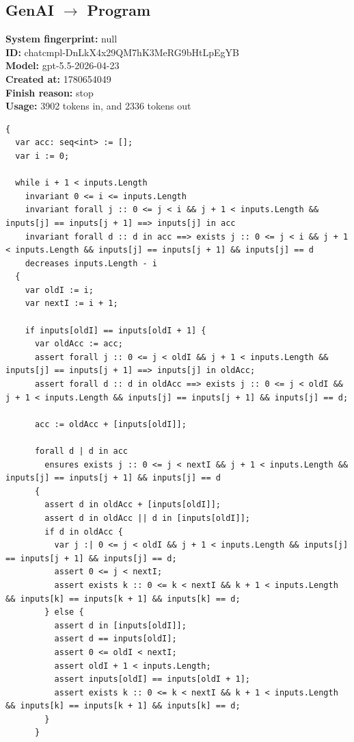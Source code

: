 \documentclass{article}
\begin{document}
\subsection*{GenAI $\rightarrow$ Program}
\textbf{System fingerprint: }null
\\\textbf{ID: }chatcmpl-DnLkX4x29QM7hK3MeRG9bHtLpEgYB
\\\textbf{Model: }gpt-5.5-2026-04-23
\\\textbf{Created at: }1780654049
\\\textbf{Finish reason: }stop
\\\textbf{Usage: }3902 tokens in, and 2336 tokens out
\begin{lstlisting}
{
  var acc: seq<int> := [];
  var i := 0;

  while i + 1 < inputs.Length
    invariant 0 <= i <= inputs.Length
    invariant forall j :: 0 <= j < i && j + 1 < inputs.Length && inputs[j] == inputs[j + 1] ==> inputs[j] in acc
    invariant forall d :: d in acc ==> exists j :: 0 <= j < i && j + 1 < inputs.Length && inputs[j] == inputs[j + 1] && inputs[j] == d
    decreases inputs.Length - i
  {
    var oldI := i;
    var nextI := i + 1;

    if inputs[oldI] == inputs[oldI + 1] {
      var oldAcc := acc;
      assert forall j :: 0 <= j < oldI && j + 1 < inputs.Length && inputs[j] == inputs[j + 1] ==> inputs[j] in oldAcc;
      assert forall d :: d in oldAcc ==> exists j :: 0 <= j < oldI && j + 1 < inputs.Length && inputs[j] == inputs[j + 1] && inputs[j] == d;

      acc := oldAcc + [inputs[oldI]];

      forall d | d in acc
        ensures exists j :: 0 <= j < nextI && j + 1 < inputs.Length && inputs[j] == inputs[j + 1] && inputs[j] == d
      {
        assert d in oldAcc + [inputs[oldI]];
        assert d in oldAcc || d in [inputs[oldI]];
        if d in oldAcc {
          var j :| 0 <= j < oldI && j + 1 < inputs.Length && inputs[j] == inputs[j + 1] && inputs[j] == d;
          assert 0 <= j < nextI;
          assert exists k :: 0 <= k < nextI && k + 1 < inputs.Length && inputs[k] == inputs[k + 1] && inputs[k] == d;
        } else {
          assert d in [inputs[oldI]];
          assert d == inputs[oldI];
          assert 0 <= oldI < nextI;
          assert oldI + 1 < inputs.Length;
          assert inputs[oldI] == inputs[oldI + 1];
          assert exists k :: 0 <= k < nextI && k + 1 < inputs.Length && inputs[k] == inputs[k + 1] && inputs[k] == d;
        }
      }


\end{lstlisting}
\end{document}
